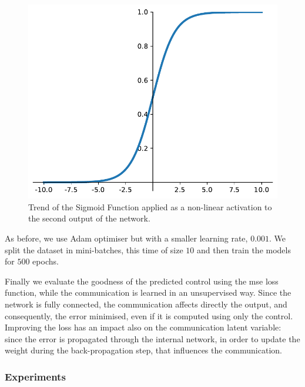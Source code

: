 \begin{figure}[!htb]
	\centering
	\includegraphics[width=.5\textwidth]{contents/images/sigmoid2}%
	\caption[Trend of the Sigmoid activation function.]{Trend of the Sigmoid 
	Function applied as a non-linear activation to the second output of the 
	network.}
	\label{fig:sigmoid}
\end{figure}

As before, we use Adam optimiser but with a smaller learning rate, $0.001$. 
We split the dataset in mini-batches, this time of size $10$ and then train 
the models for $500$ epochs. 

Finally we evaluate the goodness of the predicted control using the \gls{mse} 
loss function, while the communication is learned in an unsupervised way.
Since the network is fully connected, the communication affects directly the 
output, and consequently, the error minimised, even if it is computed using 
only the control. Improving the loss has an impact also on the 
communication latent variable: since the error is propagated through the 
internal network, in order to update the weight during the back-propagation 
step, that influences the 
communication.

\subsubsection{Experiments}
\label{subsubsec:expcomm}
